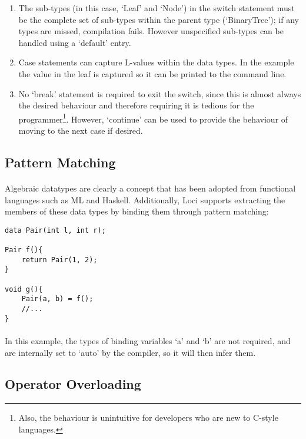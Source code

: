 \documentclass[12pt,twoside,notitlepage]{report}
\begin{document}
\begin{enumerate}
\item The sub-types (in this case, `Leaf' and `Node') in the switch statement must be the complete set of sub-types within the parent type (`BinaryTree'); if any types are missed, compilation fails. However unspecified sub-types can be handled using a `default' entry.
\item Case statements can capture L-values within the data types. In the example the value in the leaf is captured so it can be printed to the command line.
\item No `break' statement is required to exit the switch, since this is almost always the desired behaviour and therefore requiring it is tedious for the programmer\footnote{Also, the behaviour is unintuitive for developers who are new to C-style languages.}. However, `continue' can be used to provide the behaviour of moving to the next case if desired.
\end{enumerate}

\clearpage

\subsection{Pattern Matching}

\paragraph{}
Algebraic datatypes are clearly a concept that has been adopted from functional languages such as ML and Haskell. Additionally, Loci supports extracting the members of these data types by binding them through pattern matching:

\begin{lstlisting}
data Pair(int l, int r);

Pair f(){
	return Pair(1, 2);
}

void g(){
	Pair(a, b) = f();
	//...
}
\end{lstlisting}

\paragraph{}
In this example, the types of binding variables `a' and `b' are not required, and are internally set to `auto' by the compiler, so it will then infer them.

\clearpage

\subsection{Operator Overloading}
\end{document}

